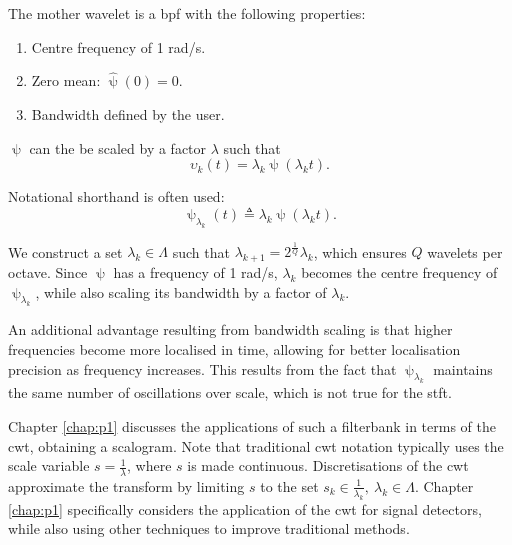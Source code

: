 The mother wavelet is a \ac{bpf} with the following properties:
\begin{enumerate}
    \item Centre frequency of 1 rad/s.
    \item Zero mean: $\hat{\uppsi}(0) = 0$.
    \item Bandwidth defined by the user.
\end{enumerate}


$\uppsi$ can the be scaled by a factor $\lambda$ such that
\begin{equation}
    \upsilon_k(t) = \lambda_k \uppsi(\lambda_k t).
\end{equation}

Notational shorthand is often used: 
\begin{equation}
    \uppsi_{\lambda_k}(t) \triangleq \lambda_k \uppsi(\lambda_k t).
\end{equation}

We construct a set $\lambda_k \in \Lambda$ such that $\lambda_{k+1} = 2^\frac{1}{Q}\lambda_{k}$, which ensures $Q$ wavelets per octave. Since $\uppsi$ has a frequency of 1 rad/s, $\lambda_k$ becomes the centre frequency of $\uppsi_{\lambda_k}$, while also scaling its bandwidth by a factor of $\lambda_k$. 

An additional advantage resulting from bandwidth scaling is that higher frequencies become more localised in time, allowing for better localisation precision as frequency increases. This results from the fact that $\uppsi_{\lambda_k}$ maintains the same number of oscillations over scale, which is not true for the \ac{stft}.

Chapter \ref{chap:p1} discusses the applications of such a filterbank in terms of the \ac{cwt}, obtaining a scalogram. Note that traditional \ac{cwt} notation typically uses the scale variable $s = \frac{1}{\lambda}$, where $s$ is made continuous. Discretisations of the \ac{cwt} approximate the transform by limiting $s$ to the set $s_k \in \frac{1}{\lambda_k}, \ \lambda_k \in \Lambda$. Chapter \ref{chap:p1} specifically considers the application of the \ac{cwt} for signal detectors, while also using other techniques to improve traditional methods.

